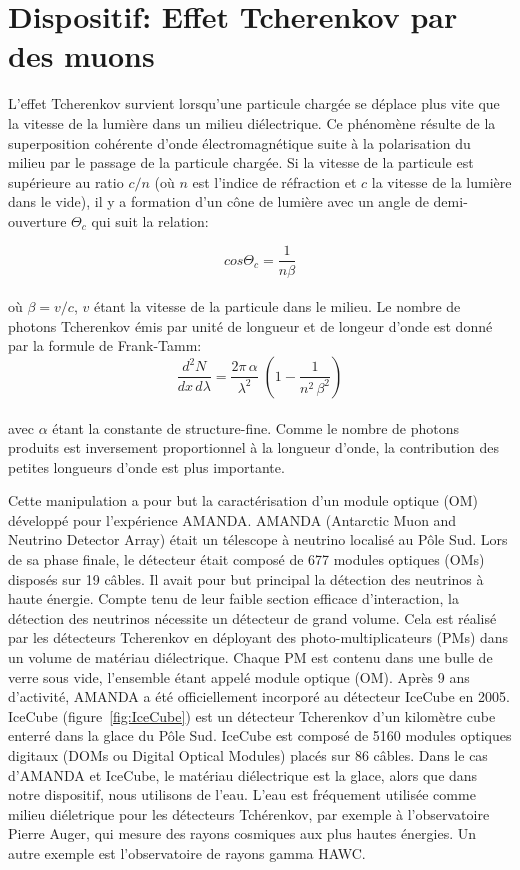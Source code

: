 \section{Dispositif: Effet Tcherenkov par des muons}
\label{sect:Tcherenkov_muon}

L'effet Tcherenkov survient lorsqu'une particule chargée se déplace plus vite que la vitesse de la lumière dans un milieu diélectrique. Ce phénomène résulte de la superposition cohérente d'onde électromagnétique suite à la polarisation du milieu par le passage de la particule chargée. Si la vitesse de la particule est supérieure au ratio $c/n$ (où $n$ est l'indice de réfraction et $c$ la vitesse de la lumière dans le vide), il y a formation d'un cône de lumière avec un angle de demi-ouverture $\Theta_c$ qui suit la relation:

\begin{equation}
    cos\Theta_c = \frac{1}{n\beta}
\end{equation}\\
où $\beta = v/c$, $v$ étant la vitesse de la particule dans le milieu. Le nombre de photons Tcherenkov émis par unité de longueur et de longeur d'onde est donné par la formule de Frank-Tamm:
\begin{equation}
     \frac{d^2N}{dx \, d\lambda} = \frac{2\pi \, \alpha}{\lambda^2} \; (1- \frac{1}{n^2 \, \beta^2} )
\end{equation}\\
avec $\alpha$ étant la constante de structure-fine. Comme le nombre de photons produits est inversement proportionnel à la longueur d'onde, la contribution des petites longueurs d'onde est plus importante.

Cette manipulation a pour but la caractérisation d'un module optique (OM) développé pour l'expérience AMANDA. AMANDA (Antarctic Muon and Neutrino Detector Array) était  un télescope à neutrino localisé au Pôle Sud. Lors de sa phase finale, le détecteur était composé de 677 modules optiques (OMs) disposés sur 19 câbles. Il avait pour but principal la détection des neutrinos à haute énergie. Compte tenu de leur faible section efficace d'interaction, la détection des neutrinos nécessite un détecteur de grand volume. Cela est réalisé par les détecteurs Tcherenkov en déployant des photo-multiplicateurs (PMs) dans un volume de matériau diélectrique. Chaque PM est contenu dans une bulle de verre sous vide, l'ensemble étant appelé module optique (OM). Après 9 ans d'activité, AMANDA a été officiellement incorporé au détecteur IceCube en 2005. IceCube (figure~\ref{fig:IceCube}) est un détecteur Tcherenkov d'un kilomètre cube enterré dans la glace du Pôle Sud. IceCube est composé de 5160 modules optiques digitaux (DOMs ou Digital Optical Modules) placés sur 86 câbles. Dans le cas d'AMANDA et IceCube, le matériau diélectrique est la glace, alors que dans notre dispositif, nous utilisons de l'eau. L’eau est fréquement utilisée comme milieu diéletrique pour les détecteurs Tchérenkov, par exemple à l'observatoire Pierre Auger, qui mesure des rayons cosmiques aux plus hautes énergies. Un autre exemple est l'observatoire de rayons gamma HAWC.

